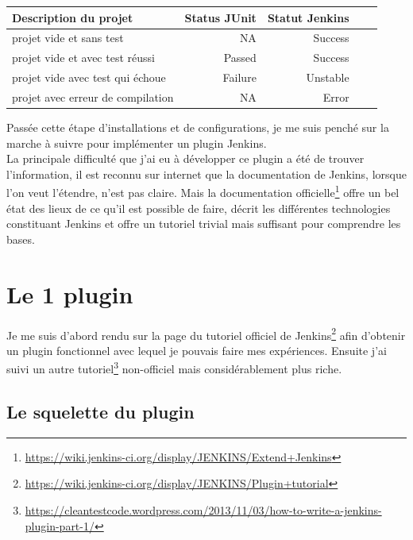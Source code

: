 \vspace{0.5cm}

\begin{tabular}{|l|rr|c|c|}
	\hline
  \textbf{Description du projet} 							& \textbf{Status JUnit} 	& \textbf{Statut Jenkins}\\
  \hline
  projet vide et sans test 						& NA 						& Success\\
	
	projet vide et avec test réussi			& Passed				& Success\\
  
  projet vide avec test qui échoue 		& Failure				& Unstable\\
	
  projet avec erreur de compilation 	& NA						& Error\\
  \hline
\end{tabular}

\vspace{0.5cm}

Passée cette étape d'installations et de configurations, je me suis penché sur la marche à suivre pour implémenter un plugin Jenkins.\\
La principale difficulté que j'ai eu à développer ce plugin a été de trouver l'information, il est reconnu sur internet que la documentation de Jenkins, lorsque l'on veut l'étendre, n'est pas claire. Mais la documentation officielle\footnote{\url{https://wiki.jenkins-ci.org/display/JENKINS/Extend+Jenkins}} offre un bel état des lieux de ce qu'il est possible de faire, décrit les différentes technologies constituant Jenkins et offre un tutoriel trivial mais suffisant pour comprendre les bases.\\



\section{Le 1 plugin}

Je me suis d'abord rendu sur la page du tutoriel officiel de Jenkins\footnote{\url{https://wiki.jenkins-ci.org/display/JENKINS/Plugin+tutorial}} afin d'obtenir un plugin fonctionnel avec lequel je pouvais faire mes expériences. Ensuite j'ai suivi un autre tutoriel\footnote{\url{https://cleantestcode.wordpress.com/2013/11/03/how-to-write-a-jenkins-plugin-part-1/}} non-officiel mais considérablement plus riche.\\

\subsection{Le squelette du plugin}
